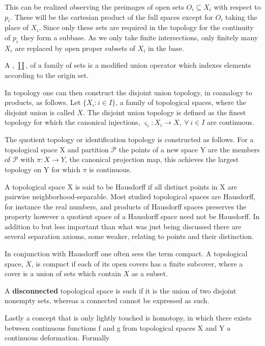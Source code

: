 \documentclass[../../main.tex]{subfiles}
\begin{document}
    This can be realized observing the preimages of open sets $O_i \subseteq X_i$ with respect to $p_i$. These will be the cartesian product of the full spaces except for $O_i$ taking the place of $X_i$. Since only these sets are required in the topology for the continuity of $p_i$ they form a subbase. As we only take finite intersections, only finitely many $X_i$ are replaced by open proper subsets of $X_i$ in the base.
    
    \begin{definition}
        A , $\coprod$, of a family of sets is a modified union operator which indexes elements according to the origin set. 
    \end{definition}
    
    In topology one can then construct the disjoint union topology, in coanalogy to products, as follows. Let $\{X_i : i \in I\}$, a family of topological spaces, where the disjoint union is called $X$. The disjoint union topology is defined as the finest topology for which the canonical injections, $\varsigma_i :X_i\to X, \: \forall\: i \in I$ are continuous.
    
    The quotient topology or identification topology is constructed as follows. For a topological space X and partition $\mathcal{P}$ the points of a new space Y are the members of $\mathcal{P}$ with $\pi:X\to Y$, the canonical projection map, this achieves the largest topology on Y for which $\pi$ is continuous.
    
    A topological space X is said to be Hausdorff if all distinct points in X are pairwise neighborhood-separable. Most studied topological spaces are Hausdorff, for instance the real numbers, and products of Hausdorff spaces preserves the property however a quotient space of a Hausdorff space need not be Hausdorff. In addition to but less important than what was just being discussed there are several separation axioms, some weaker, relating to points and their distinction. 
    
    In conjunction with Hausdorff one often sees the term compact. A topological space, $X$, is compact if each of its open covers has a finite subcover, where a cover is a union of sets which contain $X$ as a subset. 
    
    A \textbf{disconnected} topological space is such if it is the union of two disjoint nonempty sets, whereas a connected cannot be expressed as such. 

    Lastly a concept that is only lightly touched is homotopy, in which there exists between continuous functions f and g from topological spaces X and Y a continuous deformation. Formally
\end{document}
